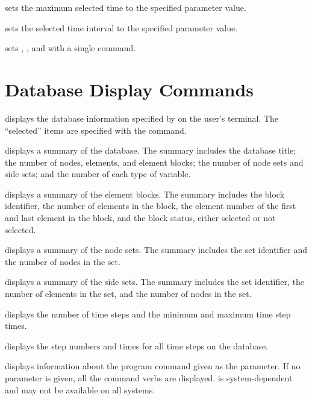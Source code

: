  {
 sets the maximum selected time  to the specified
parameter value.
}

 {
 sets the selected time interval  to the
specified parameter value.
}

 {
 sets , , and
 with a single command.
}

\section{Database Display Commands}
\label{cmd:display}

 {
 displays the database information specified by 
on the user's terminal. The ``selected'' items are specified with the
 command.

 {
displays a summary of the database. The summary includes the database
title; the number of nodes, elements, and element blocks; the number of
node sets and side sets; and the number of each type of
variable.
}

 {
displays a summary of the element blocks. The summary includes
the block identifier, the number of elements in the block, the element
number of the first and last element in the block, and the block status,
either selected or not selected.
}

 {
displays a summary of the node sets. The summary
includes the set identifier and the number of nodes in the set.
}

 {
displays a summary of the side sets. The summary
includes the set identifier, the number of elements in the set, and the
number of nodes in the set.
}

 {
displays the number of time steps and the minimum and maximum time step
times.
}

 {
displays the step numbers and times for all time steps on the database.
}
}

 {
 displays information about the program command given as the
parameter. If no parameter is given, all the command verbs are
displayed.  is system-dependent and may not be available on
all systems.
}

